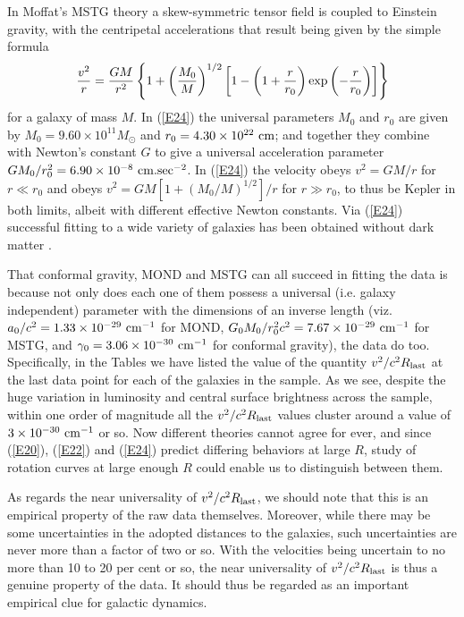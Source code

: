 \documentclass[preprint,aps]{revtex4}
\begin{document}
In Moffat's MSTG theory a skew-symmetric tensor field is coupled to Einstein gravity, with the centripetal accelerations that result being given by the simple formula
% 
\begin{equation}
\frac{v^2}{r}=\frac{GM}{r^2}\left\{1+\left(\frac{M_0}{M}\right)^{1/2}\left[1-\left(1+\frac{r}{r_0}\right)
{\rm exp}\left(-\frac{r}{r_0}\right)\right]\right\}
\label{E24}
\end{equation} 
%
for a galaxy of mass $M$. In (\ref{E24}) the universal parameters $M_0$ and $r_0$ are given by $M_0=9.60\times 10^{11}M_{\odot}$ and $r_0=4.30\times 10^{22}~{\rm cm}$; and together they combine with Newton's constant $G$ to give a universal acceleration parameter $GM_0/r_0^2=6.90\times 10^{-8}~{\rm cm.sec}^{-2}$. In (\ref{E24}) the velocity obeys $v^2=GM/r$ for $r \ll r_0$ and obeys $v^2=GM[1+(M_0/M)^{1/2}]/r$ for $r \gg r_0$, to thus be Kepler in both limits, albeit  with different effective Newton constants. Via (\ref{E24}) successful fitting to a wide variety of galaxies has been obtained without dark matter \cite{Brownstein2006}.

That conformal gravity, MOND and MSTG can all succeed in fitting the data is because not only does each one of them possess  a universal (i.e. galaxy independent) parameter with the dimensions of an inverse length (viz. $a_0/c^2=1.33\times 10^{-29}~{\rm cm}^{-1}$ for MOND, $G_0M_0/r_0^2c^2=7.67\times 10^{-29}~{\rm cm}^{-1}$ for MSTG, and $\gamma_0=3.06\times 10^{-30}~{\rm cm}^{-1}$ for conformal gravity), the data do too. Specifically, in the Tables we have listed the value of the quantity $v^2/c^2R_{\rm last}$ at the last data point for each of the galaxies in the sample. As we see, despite the huge variation in luminosity and central surface brightness across the sample, within one order of magnitude all the $v^2/c^2R_{\rm last}$ values cluster around a value of $3\times 10^{-30}~{\rm cm}^{-1}$ or so. Now different theories cannot agree for ever, and since (\ref{E20}), (\ref{E22}) and (\ref{E24}) predict differing behaviors at large $R$, study of rotation curves at large enough $R$ could enable us to distinguish between them. 

As regards the near universality of $v^2/c^2R_{\rm last}$, we should note that this is an empirical property of the raw data themselves. Moreover, while there may be some uncertainties in the adopted distances to the galaxies, such uncertainties are never more than a factor of two or so. With the velocities being uncertain to no more than 10 to 20 per cent or so, the near universality of $v^2/c^2R_{\rm last}$ is thus a genuine property of the data. It should thus be regarded as an important empirical clue for galactic dynamics. 
\end{document}
